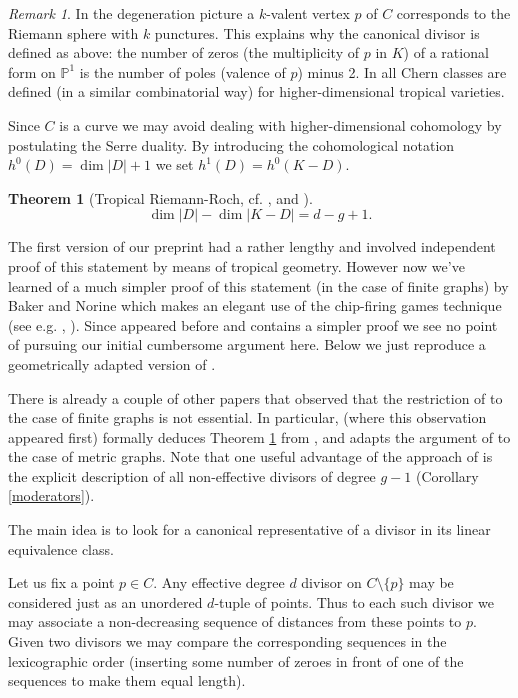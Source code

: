 \documentclass[12pt]{amsart}
\theoremstyle{plain}
\newtheorem{theorem}{Theorem}[section]
\theoremstyle{definition}
\theoremstyle{remark}
\newtheorem*{remark}{Remark}
\newcommand{\PP}{\mathbb P}   %
\newcommand{\<}{\langle}   %
\renewcommand{\>}{\rangle} %
\begin{document}
\begin{remark} In the degeneration picture a $k$-valent vertex $p$ of $C$
corresponds to the Riemann sphere with $k$ punctures. This explains
why the canonical divisor is defined as above:  the number of zeros
(the multiplicity of $p$ in $K$) of a rational form on  $\PP^1$ is
the number of poles (valence of $p$) minus 2.
In \cite{Mibook} all Chern classes are defined (in a similar combinatorial way)
for higher-dimensional tropical varieties.
\end{remark}

Since $C$ is a curve we may avoid dealing with higher-dimensional
cohomology by postulating the Serre duality. By introducing the cohomological
notation $h^0(D)= \dim |D|+1$ we set $h^1(D)=h^0(K-D)$.

\begin{theorem}[Tropical Riemann-Roch, cf. \cite{BN}, \cite{GK} and \cite{MZ1}]\label{thm:rr}
$$\dim|D|- \dim|K-D|= d-g+1.$$
\end{theorem}

The first version of our preprint \cite{MZ1} had a rather lengthy and involved independent
proof of this statement by means of tropical geometry.
However now we've learned of a much simpler proof of this statement
(in the case of finite graphs) by Baker and Norine \cite{BN} which
makes an elegant use of the chip-firing games technique (see e.g. \cite{BLS}, \cite{Biggs1}).
Since \cite{BN} appeared before \cite{MZ1} and contains a simpler proof
we see no point of pursuing our initial cumbersome argument here.
Below we just reproduce a geometrically adapted version of \cite{BN}.

There is already a couple of other papers that observed that the restriction
of \cite{BN} to the case of finite graphs is not essential. In particular,
\cite{GK} (where this observation appeared first) formally deduces
Theorem \ref{thm:rr} from \cite{BN}, and \cite{HKN}
adapts the argument of \cite{BN} to the case of metric graphs.
Note that one useful advantage of the approach of \cite{BN}
is the explicit description of all non-effective divisors
of degree $g-1$ (Corollary \ref{moderators}).


The main idea is to look for a canonical representative of a divisor
in its linear equivalence class.

Let us fix a point $p\in C$.
Any effective degree $d$ divisor on $C\setminus\{p\}$ may be considered just
as an unordered $d$-tuple of points. Thus to each such
divisor we may associate a non-decreasing sequence of distances
from these points to $p$. Given two divisors we may compare the
corresponding sequences in the lexicographic order (inserting some
number of zeroes in front of one of the sequences to make them
equal length).
\end{document}
